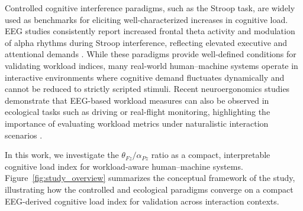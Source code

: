 \documentclass[10pt]{iopart}
\begin{document}
Controlled cognitive interference paradigms, such as the Stroop
task, are widely used as benchmarks for eliciting well-characterized
increases in cognitive load. EEG studies consistently report
increased frontal theta activity and modulation of alpha rhythms
during Stroop interference, reflecting elevated executive and
attentional demands \cite{c5,c9}. While these paradigms provide
well-defined conditions for validating workload indices, many
real-world human--machine systems operate in interactive
environments where cognitive demand fluctuates dynamically and
cannot be reduced to strictly scripted stimuli. Recent
neuroergonomics studies demonstrate that EEG-based workload
measures can also be observed in ecological tasks such as driving
or real-flight monitoring, highlighting the importance of
evaluating workload metrics under naturalistic interaction
scenarios \cite{DiFlumeri2018_RealDrivingMWL,Dehais2019_RealFlightDryEEG}.

In this work, we investigate the $\theta_{Fz}/\alpha_{Pz}$ ratio
as a compact, interpretable cognitive load index for workload-aware
human--machine systems. Figure~\ref{fig:study_overview} summarizes
the conceptual framework of the study, illustrating how the
controlled and ecological paradigms converge on a compact
EEG-derived cognitive load index for validation across interaction
contexts.
\end{document}
